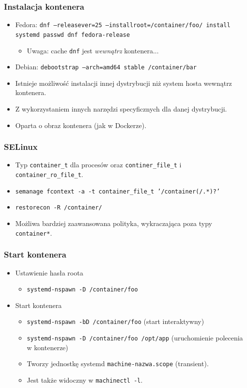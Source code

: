 \documentclass[dvipsnames,table]{beamer}
\begin{document}
\begin{frame}
\frametitle{Instalacja kontenera}
\begin{itemize}
	\item Fedora: {\tt dnf --releasever=25 --installroot=/container/foo/ install systemd passwd dnf fedora-release}
	\begin{itemize}
		\item Uwaga: cache {\tt dnf} jest {\it wewnątrz} kontenera... 
	\end{itemize}
	\item Debian: {\tt debootstrap --arch=amd64 stable /container/bar}
	\item Istnieje możliwość instalacji innej dystrybucji niż system hosta wewnątrz kontenera.
	\item Z wykorzystaniem innych narzędzi specyficznych dla danej dystrybucji.
	\item Oparta o obraz kontenera (jak w Dockerze).
\end{itemize}
\end{frame}

\begin{frame}
\frametitle{SELinux}
\begin{itemize}
	\item Typ {\tt container\_t} dla procesów oraz {\tt continer\_file\_t} i {\tt container\_ro\_file\_t}.
	\item {\tt semanage fcontext -a -t container\_file\_t '/container(/.*)?'}
	\item {\tt restorecon -R /container/}
	\item Możliwa bardziej zaawansowana polityka, wykraczająca poza typy {\tt container*}.
\end{itemize}	
\end{frame}

\begin{frame}
\frametitle{Start kontenera}
\begin{itemize}
	\item Ustawienie hasła roota
	\begin{itemize}
		\item {\tt systemd-nspawn -D /container/foo}
	\end{itemize}
	\item Start kontenera
	\begin{itemize}
		\item {\tt systemd-nspawn -bD /container/foo} (start interaktywny)
		\item {\tt systemd-nspawn -D /container/foo /opt/app} (uruchomienie polecenia w kontenerze)
		\item Tworzy jednostkę systemd {\tt machine-nazwa.scope} (transient).
		\item Jest także widoczny w {\tt machinectl -l}.
	\end{itemize}	
\end{itemize}
\end{frame}
\end{document}
